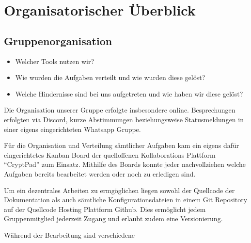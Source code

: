 \section{Organisatorischer Überblick}

\subsection{Gruppenorganisation}

\begin{itemize}
    \item Welcher Tools nutzen wir?
    \item Wie wurden die Aufgaben verteilt und wie wurden diese gelöst?
    \item Welche Hindernisse sind bei uns aufgetreten und wie haben wir diese gelöst?
\end{itemize}

Die Organisation unserer Gruppe erfolgte insbesondere online. Besprechungen erfolgten via Discord, kurze Abstimmungen beziehungsweise Statusmeldungen in einer eigens eingerichteten Whatsapp Gruppe.

Für die Organisation und Verteilung sämtlicher Aufgaben kam ein eigens dafür eingerichtetes Kanban Board der quelloffenen Kollaborations Plattform \enquote{CryptPad} zum Einsatz. Mithilfe des Boards konnte jeder nachvollziehen welche Aufgaben bereits bearbeitet werden oder noch zu erledigen sind.

Um ein dezentrales Arbeiten zu ermgöglichen liegen sowohl der Quellcode der Dokumentation als auch sämtliche Konfigurationsdateien in einem Git Repository auf der Quellcode Hosting Plattform Github. Dies ermöglicht jedem Gruppenmitglied jederzeit Zugang und erlaubt zudem eine Versionierung.

Während der Bearbeitung sind verschiedene 